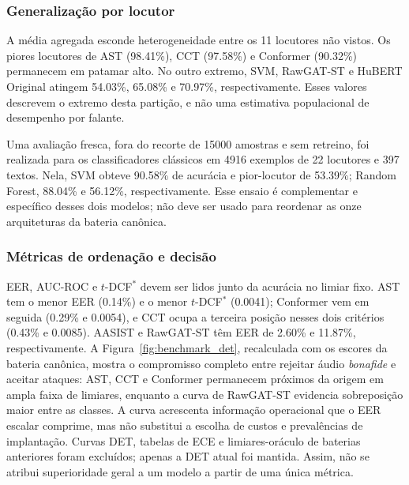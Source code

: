 \documentclass[12pt,a4paper]{article}
\begin{document}
\subsubsection{Generalização por locutor}
\label{sec:pior_locutor}

A média agregada esconde heterogeneidade entre os \num{11} locutores não vistos.
Os piores locutores de AST (\num{98,41}\%), CCT (\num{97,58}\%) e Conformer
(\num{90,32}\%) permanecem em patamar alto. No outro extremo, SVM, RawGAT-ST
e HuBERT Original atingem \num{54,03}\%, \num{65,08}\% e \num{70,97}\%,
respectivamente. Esses valores descrevem o extremo desta partição, e não uma
estimativa populacional de desempenho por falante.

Uma avaliação fresca, fora do recorte de \num{15000} amostras e sem retreino,
foi realizada para os classificadores clássicos em \num{4916} exemplos de
\num{22} locutores e \num{397} textos. Nela, SVM obteve \num{90,58}\% de
acurácia e pior-locutor de \num{53,39}\%; Random Forest, \num{88,04}\% e
\num{56,12}\%, respectivamente. Esse ensaio é complementar e específico desses
dois modelos; não deve ser usado para reordenar as onze arquiteturas da bateria
canônica.

\subsubsection{Métricas de ordenação e decisão}
\label{sec:ponto_operacao}
\label{sec:calibracao_discriminacao}
\label{sec:calibracao_decisao}

EER, AUC-ROC e $t$-DCF$^\ast$ devem ser lidos junto da acurácia no limiar fixo.
AST tem o menor EER (\num{0,14}\%) e o menor $t$-DCF$^\ast$ (\num{0,0041});
Conformer vem em seguida (\num{0,29}\% e \num{0,0054}), e CCT ocupa a terceira
posição nesses dois critérios (\num{0,43}\% e \num{0,0085}). AASIST e RawGAT-ST
têm EER de \num{2,60}\% e \num{11,87}\%, respectivamente. A
Figura~\ref{fig:benchmark_det}, recalculada com os escores da bateria canônica,
mostra o compromisso completo entre rejeitar áudio \textit{bonafide} e aceitar
ataques: AST, CCT e Conformer permanecem próximos da origem em ampla faixa de
limiares, enquanto a curva de RawGAT-ST evidencia sobreposição maior entre as
classes. A curva acrescenta informação operacional que o EER escalar comprime,
mas não substitui a escolha de custos e prevalências de implantação. Curvas DET,
tabelas de ECE e limiares-oráculo de baterias anteriores foram excluídos; apenas
a DET atual foi mantida. Assim, não se atribui superioridade geral a um modelo a
partir de uma única métrica.
\end{document}
